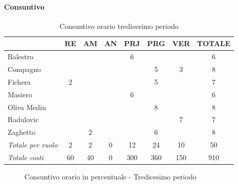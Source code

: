 \documentclass[a4paper,12pt]{article}
\begin{document}
            \paragraph{Consuntivo}
                \begin{table}[H]
                \centering
                \caption{Consuntivo orario tredicesimo periodo}
                \begin{tabular}{|l|c|c|c|c|c|c|c|}
                \hline
                    \rowcolor{lightgray}{\textbf{Membro}} & {\textbf{RE}} & {\textbf{AM}} & {\textbf{AN}} & {\textbf{PRJ}} & {\textbf{PRG}} & {\textbf{VER}} & {\textbf{TOTALE}}\\
                \hline
                    Balestro & & & & 6 & & & 6\\
                \hline
                    Compagno & & & & & 5 & 3 & 8\\
                \hline
                    Fichera & 2 & & & & 5 & & 7\\
                \hline
                    Masiero & & & & 6 & & & 6\\
                \hline
                    Oliva Medin & & & & & 8 & & 8\\
                \hline
                    Radulovic & & & & & & 7 & 7\\
                \hline
                    Zaghetto & & 2 & & & 6 & & 8\\
                \hline
                    \rowcolor{lightgray}\textit{Totale per ruolo} & 2 & 2 & 0 & 12 & 24 & 10 & 50\\
                \hline
                    \rowcolor{lightgray}\textit{Totale costi} & 60 & 40 & 0 & 300 & 360 & 150 & 910\\
                \hline
                \end{tabular}
                \end{table}

                \begin{figure}[H]
                \centering
                \caption{Consuntivo orario in percentuale - Tredicesimo periodo}
                \end{figure}
                
\end{document}
